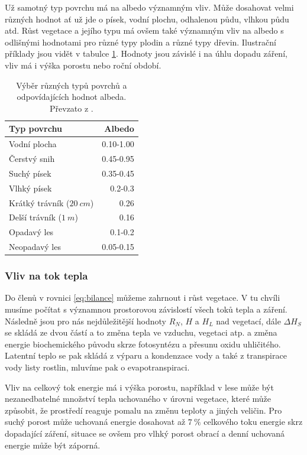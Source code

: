 Už samotný typ povrchu má na albedo významným vliv. Může dosahovat velmi různých hodnot ať už jde o písek, vodní plochu, odhalenou půdu, vlhkou půdu atd. Růst vegetace a jejího typu má ovšem také významným vliv na albedo s odlišnými hodnotami pro různé typy plodin a různé typy dřevin. Ilustrační příklady jsou vidět v tabulce \ref{tab:albedo}. Hodnoty jsou závislé i na úhlu dopadu záření, vliv má i výška porostu nebo roční období\cite{arya2001,alma}.

\begin{table}
\centering\footnotesize\sf
\begin{tabular}{lr}
\toprule
Typ povrchu & Albedo \\
\midrule
Vodní plocha & 0.10-1.00 \\
Čerstvý snih & 0.45-0.95 \\
Suchý písek & 0.35-0.45\\
Vlhký písek & 0.2-0.3\\
Krátký trávník ($\SI{20}{cm}$) & 0.26\\
Delší trávník ($\SI{1}{m}$) & 0.16\\
Opadavý les & 0.1-0.2\\
Neopadavý les & 0.05-0.15\\
\bottomrule
\end{tabular}
	\caption{Výběr různých typů povrchů a odpovídajících hodnot albeda. Převzato z \cite{arya2001}.}
\label{tab:albedo}
\end{table}

\subsubsection{Vliv na tok tepla}
Do členů v rovnici \ref{eq:bilance} můžeme zahrnout i růst vegetace. V tu chvíli musíme počítat s významnou prostorovou závislostí všech toků tepla a záření. Následně jsou pro nás nejdůležitější hodnoty $R_N$, $H$ a $H_L$ nad vegetací, dále $\Delta H_S$ se skládá ze dvou částí a to změna tepla ve vzduchu, vegetaci atp. a změna energie biochemického původu skrze fotosyntézu a přesunu oxidu uhličitého. Latentní teplo se pak skládá z výparu a kondenzace vody a také z transpirace vody listy rostlin, mluvíme pak o evapotranspiraci\cite{arya2001}. 

Vliv na celkový tok energie má i výška porostu, například v lese může být nezanedbatelné množství tepla uchovaného v úrovni vegetace, které může způsobit, že prostředí reaguje pomalu na změnu teploty a jiných veličin. Pro suchý porost může uchovaná energie dosahovat až $\SI{7}{\%}$ celkového toku energie skrz dopadající záření, situace se ovšem pro vlhký porost obrací a denní uchovaná energie může být záporná\cite{alma}. 


